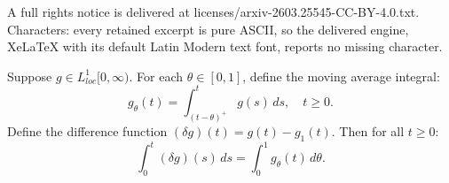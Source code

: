 \documentclass[10pt,a4paper]{amsart}
\begin{document}
A full rights notice is delivered at licenses/arxiv-2603.25545-CC-BY-4.0.txt. Characters: every retained excerpt is pure ASCII, so the delivered engine, XeLaTeX with its default Latin Modern text font, reports no missing character.
	\begin{lemma} \label{lemma:delta_integral}
		Suppose $g \in L_{loc}^1[0, \infty)$. For each $\theta \in [0, 1]$, define the moving average integral:
		\[
		g_\theta(t) = \int_{(t-\theta)^+}^t g(s) \, ds, \quad t \ge 0.
		\]
		Define the difference function $(\delta g)(t) = g(t) - g_1(t)$.
		Then for all $t \ge 0$:
		\begin{equation}
			\int_0^t (\delta g)(s) \, ds = \int_0^1 g_\theta(t) \, d\theta.
		\end{equation}
	\end{lemma}
\end{document}
